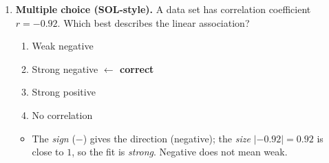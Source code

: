\documentclass[10pt]{article}
\begin{document}
\begin{enumerate}[leftmargin=1.8em, itemsep=14pt]
  \item \textbf{Multiple choice (SOL-style).} A data set has correlation coefficient $r=-0.92$. Which best
        describes the linear association?
        \begin{enumerate}[label=(\Alph*), leftmargin=1.8em, itemsep=2pt]
          \item Weak negative
          \item Strong negative \quad\textcolor{keyred}{\textbf{$\leftarrow$ correct}}
          \item Strong positive
          \item No correlation
        \end{enumerate}
        \begin{itemize}[leftmargin=1.4em, nosep]
          \item The \emph{sign} ($-$) gives the direction (negative); the \emph{size} $|{-}0.92|=0.92$ is
                close to $1$, so the fit is \emph{strong}. Negative does not mean weak.
        \end{itemize}
\end{enumerate}
\end{document}

